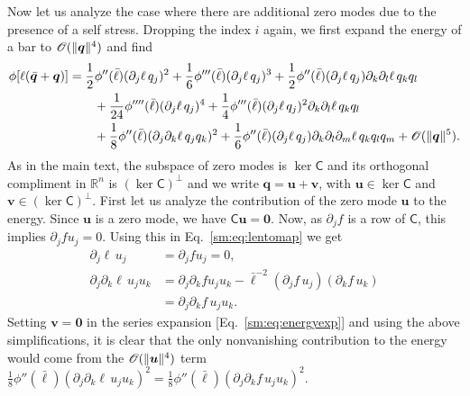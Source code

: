 Now let us analyze the case where there are additional zero modes due to the presence of a self stress.
Dropping the index $i$ again, we first expand the energy of a bar to $\mathscr{O}(\lVert\bm{q}\rVert^4)$ and find
%
\begin{equation}
  \begin{aligned}
    \phi[\ell(\bar{\bm{q}} + \bm{q})] &=
    \frac{1}{2}\phi''(\bar{\ell})(\partial_j \ell\,q_j)^2 +
    \frac{1}{6}\phi'''(\bar{\ell})(\partial_j \ell\,q_j)^3 +
    \frac{1}{2}\phi''(\bar{\ell})(\partial_j \ell\,q_j)\partial_k\partial_l \ell\, q_k q_l\\ &\qquad+
    \frac{1}{24}\phi''''(\bar{\ell})(\partial_j \ell\,q_j)^4 +
    \frac{1}{4}\phi'''(\bar{\ell})(\partial_j \ell\,q_j)^2 \partial_k \partial_l \ell\, q_k q_l\\ &\qquad+
    \frac{1}{8}\phi''(\bar{\ell})(\partial_j\partial_k \ell\, q_j q_k)^2 +
    \frac{1}{6}\phi''(\bar{\ell})(\partial_j \ell\, q_j)\partial_k\partial_l\partial_m \ell\, q_k q_l q_m + \mathscr{O}(\lVert\bm{q}\rVert^5).
  \end{aligned}
  \label{sm:eq:energyexp}
\end{equation}
%
As in the main text, the subspace of zero modes is $\ker\mathsf{C}$ and its orthogonal compliment in $\mathbb{R}^n$ is $(\ker\mathsf{C})^\perp$ and we write $\bm{q} = \bm{u} + \bm{v}$, with $\bm{u} \in \ker\mathsf{C}$ and $\bm{v} \in (\ker\mathsf{C})^{\perp}$.
First let us analyze the contribution of the zero mode $\bm{u}$ to the energy.
Since $\bm{u}$ is a zero mode, we have $\mathsf{C}\bm{u} = \bm{0}$.
Now, as $\partial_j f$ is a row of $\mathsf{C}$, this implies $\partial_j f u_j = 0$.
Using this in Eq.~\eqref{sm:eq:lentomap} we get
%
\begin{equation}
  \begin{aligned}
    \partial_j \ell\,u_j &= \partial_j f u_j=0,\\
    \partial_j \partial_k \ell\, u_j u_k
                        &= \partial_j\partial_k f u_j u_k - \bar{\ell}^{-2}(\partial_j f\, u_j) (\partial_k f\, u_k)\\
                        &= \partial_j\partial_k f\, u_j u_k.
  \end{aligned}
\end{equation}
%
Setting $\bm{v} = \bm{0}$ in the series expansion [Eq.~\eqref{sm:eq:energyexp}] and using the above simplifications, it is clear that the only nonvanishing contribution to the energy would come from the $\mathscr{O}(\lVert\bm{u}\rVert^4)$ term $\frac{1}{8}{\phi''(\bar{\ell})}(\partial_j \partial_k \ell\, u_j u_k)^2 = \frac{1}{8}{\phi''(\bar{\ell})}(\partial_j \partial_k f\, u_j u_k)^2$.

